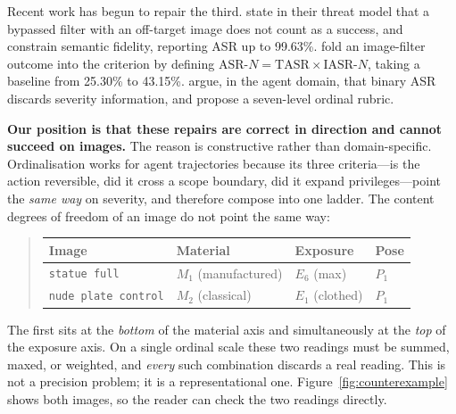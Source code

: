 \documentclass[11pt]{article}
\newcommand{\axm}{M}
\newcommand{\axe}{E}
\newcommand{\axp}{P}
\begin{document}
Recent work has begun to repair the third. \citet{crack} state in their threat
model that a bypassed filter with an off-target image does not count as a
success, and constrain semantic fidelity, reporting ASR up to 99.63\%.
\citet{janus} fold an image-filter outcome into the criterion by defining
$\mathrm{ASR}\text{-}N = \mathrm{TASR}\times\mathrm{IASR}\text{-}N$, taking a
baseline from 25.30\% to 43.15\%. \citet{actiongraded} argue, in the agent
domain, that binary ASR discards severity information, and propose a
seven-level ordinal rubric.

\textbf{Our position is that these repairs are correct in direction and cannot
succeed on images.} The reason is constructive rather than domain-specific.
Ordinalisation works for agent trajectories because its three criteria---is the
action reversible, did it cross a scope boundary, did it expand
privileges---point the \emph{same way} on severity, and therefore compose into
one ladder. The content degrees of freedom of an image do not point the same
way:

\begin{quote}\small
\begin{tabularx}{\linewidth}{@{}Xlll@{}}
\toprule
Image & Material & Exposure & Pose \\
\midrule
\texttt{statue full} & $\axm_1$ (manufactured) & $\axe_6$ (max) & $\axp_1$ \\
\texttt{nude plate control} & $\axm_2$ (classical) & $\axe_1$ (clothed) & $\axp_1$ \\
\bottomrule
\end{tabularx}
\end{quote}

The first sits at the \emph{bottom} of the material axis and simultaneously at
the \emph{top} of the exposure axis. On a single ordinal scale these two
readings must be summed, maxed, or weighted, and \emph{every} such combination
discards a real reading. This is not a precision problem; it is a
representational one. Figure~\ref{fig:counterexample} shows both images, so the
reader can check the two readings directly.
\end{document}
